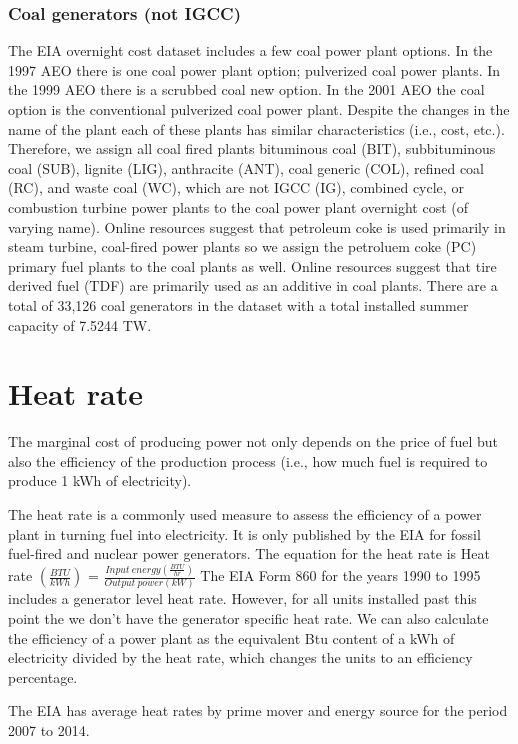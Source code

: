 \documentclass[10pt]{amsart}
\begin{document}
\subsubsection{Coal generators (not IGCC)}
The EIA overnight cost dataset includes a few coal power plant options. 
In the 1997 AEO there is one coal power plant option; pulverized coal power plants.
In the 1999 AEO there is a scrubbed coal new option. 
In the 2001 AEO the coal option is the conventional pulverized coal power plant.
Despite the changes in the name of the plant each of these plants has similar characteristics (i.e., cost, etc.).
Therefore, we assign all coal fired plants bituminous coal (BIT), subbituminous coal (SUB), lignite (LIG), anthracite (ANT), coal generic (COL), refined coal (RC), and waste coal (WC), which are not IGCC (IG), combined cycle, or combustion turbine power plants to the coal power plant overnight cost (of varying name).
Online resources suggest that petroleum coke is used primarily in steam turbine, coal-fired power plants so we assign the petroluem coke (PC) primary fuel plants to the coal plants as well.  
Online resources suggest that tire derived fuel (TDF) are primarily used as an additive in coal plants. 
There are a total of 33,126 coal generators in the dataset with a total installed summer capacity of 7.5244 TW. 

\section{Heat rate}
The marginal cost of producing power not only depends on the price of fuel but also the efficiency of the production process (i.e., how much fuel is required to produce 1 kWh of electricity). 

The heat rate is a commonly used measure to assess the efficiency of a power plant in turning fuel into electricity. 
It is only published by the EIA for fossil fuel-fired and nuclear power generators. 
The equation for the heat rate is Heat rate $(\frac{BTU}{kWh})$ = $\frac{Input\ energy (\frac{BTU}{hr})}{Output\ power (kW)}$ 
The EIA Form 860 for the years 1990 to 1995 includes a generator level heat rate. 
However, for all units installed past this point the we don't have the generator specific heat rate. 
We can also calculate the efficiency of a power plant as the equivalent Btu content of a kWh of electricity divided by the heat rate, which changes the units to an efficiency percentage.

The EIA has average heat rates by prime mover and energy source for the period 2007 to 2014. 
\end{document}
